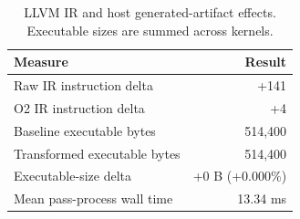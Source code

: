 \begin{table}[t]
\centering
\caption{LLVM IR and host generated-artifact effects. Executable sizes are summed across kernels.}
\label{tab:artifacts}
\small
\begin{tabular}{lr}
\toprule
Measure & Result \\
\midrule
Raw IR instruction delta & +141 \\
O2 IR instruction delta & +4 \\
Baseline executable bytes & 514,400 \\
Transformed executable bytes & 514,400 \\
Executable-size delta & +0 B (+0.000\%) \\
Mean pass-process wall time & 13.34 ms \\
\bottomrule
\end{tabular}
\end{table}
